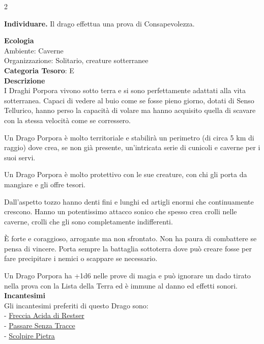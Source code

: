\begin{multicols}{2}
{\textbf{Individuare.} Il drago effettua una prova di Consapevolezza.

\textbf{Ecologia}\\
Ambiente: Caverne\\
Organizzazione: Solitario, creature sotterranee\\
\textbf{Categoria Tesoro}: E\\
\textbf{Descrizione}\\
I Draghi Porpora vivono sotto terra e si sono perfettamente adattati alla vita sotterranea.
Capaci di vedere al buio come se fosse pieno giorno, dotati di Senso Tellurico, hanno perso la capacità di volare ma hanno acquisito quella di scavare con la stessa velocità come se corressero.

Un Drago Porpora è molto territoriale e stabilirà un perimetro (di circa 5 km di raggio) dove crea, se non già presente, un'intricata serie di cunicoli e caverne per i suoi servi.

Un Drago Porpora è molto protettivo con le sue creature, con chi gli porta da mangiare e gli offre tesori.

Dall'aspetto tozzo hanno denti fini e lunghi ed artigli enormi che continuamente crescono. Hanno un potentissimo attacco sonico che spesso crea crolli nelle caverne, crolli che gli sono completamente indifferenti.

È forte e coraggioso, arrogante ma non sfrontato. Non ha paura di combattere se pensa di vincere. Porta sempre la battaglia sottoterra dove può creare fosse per fare precipitare i nemici o scappare se necessario.

Un Drago Porpora ha +1d6 nelle prove di magia e può ignorare un dado tirato nella prova con la Lista della Terra ed è immune al danno ed effetti sonori.\\
\textbf{Incantesimi}\\
Gli incantesimi preferiti di questo Drago sono:\\
- \hyperlink{Freccia Acida di Restser}{Freccia Acida di Restser}\\
- \hyperlink{Passare Senza Tracce}{Passare Senza Tracce}\\
- \hyperlink{Scolpire Pietra}{Scolpire Pietra}

}
\end{multicols}
